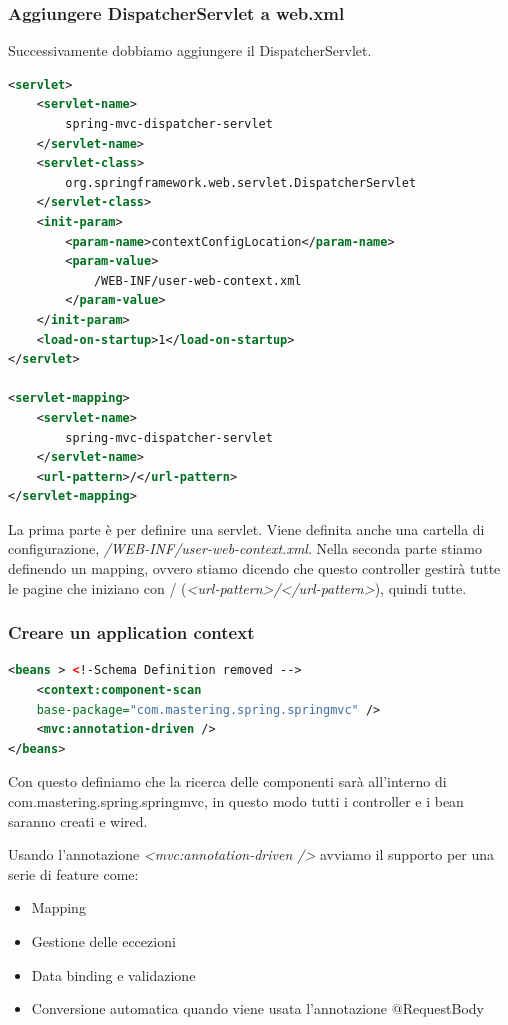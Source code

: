 \documentclass[11pt,a4paper]{book}
\begin{document}
\subsubsection{Aggiungere DispatcherServlet a web.xml}
Successivamente dobbiamo aggiungere il DispatcherServlet.
\begin{lstlisting}[language = XML]
<servlet>
	<servlet-name>
		spring-mvc-dispatcher-servlet
	</servlet-name>
	<servlet-class>
		org.springframework.web.servlet.DispatcherServlet
	</servlet-class>
	<init-param>
		<param-name>contextConfigLocation</param-name>
		<param-value>
			/WEB-INF/user-web-context.xml
		</param-value>
	</init-param>
	<load-on-startup>1</load-on-startup>
</servlet>

<servlet-mapping>
	<servlet-name>
		spring-mvc-dispatcher-servlet
	</servlet-name>
	<url-pattern>/</url-pattern>
</servlet-mapping>
\end{lstlisting}
La prima parte è per definire una servlet. Viene definita anche una cartella di configurazione, \emph{/WEB-INF/user-web-context.xml}. Nella seconda parte stiamo definendo un mapping, ovvero stiamo dicendo che questo controller gestirà tutte le pagine che iniziano con / (\emph{<url-pattern>/</url-pattern>}), quindi tutte.

\subsubsection{Creare un application context}
\begin{lstlisting}[language = XML]
<beans > <!-Schema Definition removed -->
	<context:component-scan
	base-package="com.mastering.spring.springmvc" />
	<mvc:annotation-driven />
</beans>
\end{lstlisting}
Con questo definiamo che la ricerca delle componenti sarà all'interno di com.mastering.spring.springmvc, in questo modo tutti i controller e i bean saranno creati e wired.

Usando l'annotazione \emph{<mvc:annotation-driven />} avviamo il supporto per una serie di feature come:
\begin{itemize}
	\item Mapping
	\item Gestione delle eccezioni
	\item Data binding e validazione
	\item Conversione automatica quando viene usata l'annotazione $@$RequestBody
\end{itemize}
\end{document}
